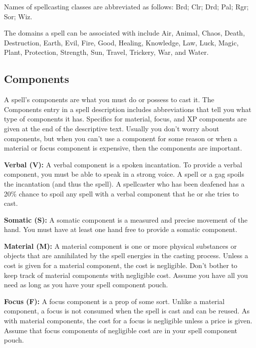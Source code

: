 Names of spellcasting classes are abbreviated as follows:  Brd;  Clr; 
 Drd;  Pal;  Rgr;  Sor;  Wiz.

The domains a spell can be associated with include Air, Animal, Chaos, Death, Destruction, 
Earth, Evil, Fire, Good, Healing, Knowledge, Law, Luck, Magic, Plant, Protection, 
Strength, Sun, Travel, Trickery, War, and Water.

\subsection{Components}

A spell's components are what you must do or possess to cast it. The Components 
entry in a spell description includes abbreviations that tell you what type of 
components it has. Specifics for material, focus, and XP components are given at 
the end of the descriptive text. Usually you don't worry about components, but 
when you can't use a component for some reason or when a material or focus component 
is expensive, then the components are important.

\textbf{Verbal (V):} A verbal component is a spoken incantation. To provide a verbal 
component, you must be able to speak in a strong voice. A  spell 
or a gag spoils the incantation (and thus the spell). A spellcaster who has been 
deafened has a 20\% chance to spoil any spell with a verbal component that he or 
she tries to cast.

\textbf{Somatic (S):} A somatic component is a measured and precise movement of 
the hand. You must have at least one hand free to provide a somatic component.

\textbf{Material (M):} A material component is one or more physical substances 
or objects that are annihilated by the spell energies in the casting process. Unless 
a cost is given for a material component, the cost is negligible. Don't bother 
to keep track of material components with negligible cost. Assume you have all 
you need as long as you have your spell component pouch.

\textbf{Focus (F):} A focus component is a prop of some sort. Unlike a material 
component, a focus is not consumed when the spell is cast and can be reused. As 
with material components, the cost for a focus is negligible unless a price is 
given. Assume that focus components of negligible cost are in your spell component 
pouch.

